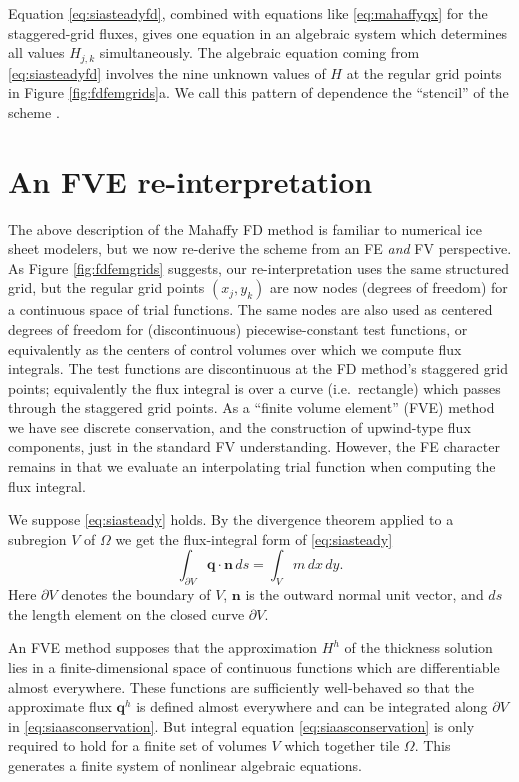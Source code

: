 \documentclass[twocolumn,letterpaper]{igs}
\newcommand\bn{\mathbf{n}}
\newcommand\bq{\mathbf{q}}
\begin{document}
Equation \eqref{eq:siasteadyfd}, combined with equations like \eqref{eq:mahaffyqx} for the staggered-grid fluxes, gives one equation in an algebraic system which determines all values $H_{j,k}$ simultaneously.  The algebraic equation coming from \eqref{eq:siasteadyfd} involves the nine unknown values of $H$ at the regular grid points in Figure \ref{fig:fdfemgrids}a.  We call this pattern of dependence the ``stencil'' of the scheme \citep{MortonMayers2005}.


\section{An FVE re-interpretation} \label{sec:fveinterpretation}

The above description of the Mahaffy FD method is familiar to numerical ice sheet modelers, but we now re-derive the scheme from an FE \emph{and} FV perspective.  As Figure \ref{fig:fdfemgrids} suggests, our re-interpretation uses the same structured grid, but the regular grid points $(x_j,y_k)$ are now nodes (degrees of freedom) for a continuous space of trial functions.  The same nodes are also used as centered degrees of freedom for (discontinuous) piecewise-constant test functions, or equivalently as the centers of control volumes over which we compute flux integrals.  The test functions are discontinuous at the FD method's staggered grid points; equivalently the flux integral is over a curve (i.e.~rectangle) which passes through the staggered grid points.  As a ``finite volume element'' (FVE) method we have see discrete conservation, and the construction of upwind-type flux components, just in the standard FV understanding.  However, the FE character remains in that we evaluate an interpolating trial function when computing the flux integral.

We suppose \eqref{eq:siasteady} holds.  By the divergence theorem applied to a subregion $V$ of $\Omega$ we get the flux-integral form of \eqref{eq:siasteady}
\begin{equation}
  \int_{\partial V} \bq \cdot \bn\,ds = \int_V m\, dx\,dy. \label{eq:siaasconservation}
\end{equation}
Here $\partial V$ denotes the boundary of $V$, $\bn$ is the outward normal unit vector, and $ds$ the length element on the closed curve $\partial V$.

An FVE method supposes that the approximation $H^h$ of the thickness solution lies in a finite-dimensional space of continuous functions which are differentiable almost everywhere.  These functions are sufficiently well-behaved so that the approximate flux $\bq^h$ is defined almost everywhere and can be integrated along $\partial V$ in \eqref{eq:siaasconservation}.  But integral equation \eqref{eq:siaasconservation} is only required to hold for a finite set of volumes $V$ which together tile $\Omega$.  This generates a finite system of nonlinear algebraic equations.
\end{document}
